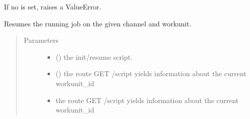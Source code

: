 \documentclass[letterpaper,10pt,english,openany,oneside]{sphinxmanual}
\begin{document}
\begin{fulllineitems}
\begin{fulllineitems}
If no  is set, raises a ValueError.

\end{fulllineitems}


\begin{fulllineitems}
\label{\detokenize{_modules/AconitySTUDIO_client:AconitySTUDIO_client.AconitySTUDIO_client.resume_job}}
Resumes the running job on the given channel and workunit.
\begin{quote}\begin{description}
\item[{Parameters}] \leavevmode\begin{itemize}
\item {} 
 () \textendash{} the init/resume script.

\item {} 
 () \textendash{} the route GET /script yields information about the current workunit\_id

\item {} 
 \textendash{} the route GET /script yields information about the current workunit\_id

\end{itemize}

\end{description}\end{quote}

\end{fulllineitems}



\end{fulllineitems}
\end{document}
